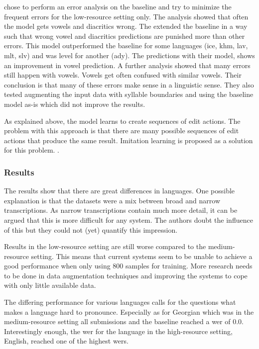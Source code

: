 \citet{lo-nicolai-2021-linguistic} chose to perform an error analysis on the baseline and try to minimize the frequent errors for the low-resource setting only. The analysis showed that often the model gets vowels and diacritics wrong. The extended the baseline in a way such that wrong vowel and diacritics predictions are punished more than other errors. This model outperformed the baseline for some languages (ice, khm, lav, mlt, slv) and was level for another (ady). The predictions with their model, shows an improvement in vowel prediction. A further analysis showed that many errors still happen with vowels. Vowels get often confused with similar vowels. Their conclusion is that many of these errors make sense in a linguistic sense.   
They also tested augmenting the input data with syllable boundaries and using the baseline model as-is which did not improve the results. 

As explained above, the model learns to create sequences of edit actions. The problem with this approach is that there are many possible sequences of edit actions that produce the same result. Imitation learning is proposed as a solution for this problem. . 

\subsubsection*{Results}
The results show that there are great differences in languages. One possible explanation is that the datasets were a mix between broad and narrow transcriptions. As narrow transcriptions contain much more detail, it can be argued that this is more difficult for any system. The authors doubt the influence of this but they could not (yet) quantify this impression. 

Results in the low-resource setting are still worse compared to the medium-resource setting. This means that current systems seem to be unable to achieve a good performance when only using 800 samples for training. More research needs to be done in data augmentation techniques and improving the systems to cope with only little available data.

The differing performance for various languages calls for the questions what makes a language hard to pronounce. Especially as for Georgian which was in the medium-resource setting all submissions and the baseline reached a \ac{wer} of $0.0$. Interestingly enough, the \ac{wer} for the language in the high-resource setting, English, reached one of the highest \ac{wer}s.





